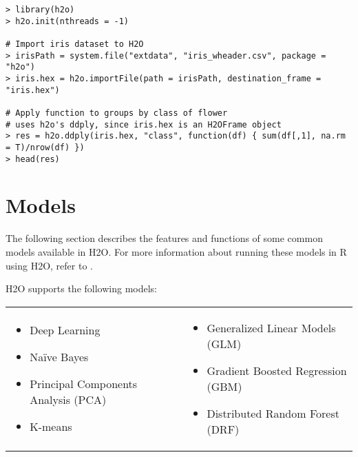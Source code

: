 {{\begin{lstlisting}[style=R]
> library(h2o)
> h2o.init(nthreads = -1)

# Import iris dataset to H2O
> irisPath = system.file("extdata", "iris_wheader.csv", package = "h2o")
> iris.hex = h2o.importFile(path = irisPath, destination_frame = "iris.hex")

# Apply function to groups by class of flower
# uses h2o's ddply, since iris.hex is an H2OFrame object
> res = h2o.ddply(iris.hex, "class", function(df) { sum(df[,1], na.rm = T)/nrow(df) })
> head(res)
\end{lstlisting}

\section{Models}

The following section describes the features and functions of some common models available in H2O.  For more information about running these models in R using H2O, refer to . 


\begin{minipage}{\textwidth}
H2O supports the following models:  


\begin{frame}%

\begin{tabular}{p{5.5cm}p{5.5cm}}

\begin{itemize}
 \item Deep Learning
  \item Na\"{i}ve Bayes
  \item Principal Components Analysis (PCA)
  \item K-means
\end{itemize} &

\begin{itemize}
     \item Generalized Linear Models (GLM) 
     \item Gradient Boosted Regression (GBM)
  \item Distributed Random Forest (DRF)
\end{itemize}


\end{tabular}
\end{frame}
\end{minipage}}}
